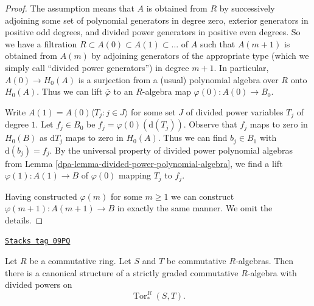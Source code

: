 \begin{proof}

The assumption means that $A$ is obtained from $R$ by successively adjoining
some set of polynomial generators in degree zero, exterior generators
in positive odd degrees, and divided power generators
in positive even degrees. So we have a filtration
$R \subset A(0) \subset A(1) \subset \ldots$
of $A$ such that $A(m + 1)$ is obtained from $A(m)$ by adjoining
generators of the appropriate type (which we simply call
``divided power generators'') in degree $m + 1$.
In particular, $A(0) \to H_0(A)$ is a surjection from a (usual) polynomial
algebra over $R$ onto $H_0(A)$. Thus we can lift $\overline{\varphi}$
to an $R$-algebra map $\varphi(0) : A(0) \to B_0$.

\medskip\noindent
Write $A(1) = A(0)\langle T_j:j\in J\rangle$ for some
set $J$ of divided power variables $T_j$ of degree $1$. Let $f_j \in B_0$
be $f_j = \varphi(0)(\text{d}(T_j))$. Observe that $f_j$
maps to zero in $H_0(B)$ as $\text{d}T_j$ maps to zero in $H_0(A)$.
Thus we can find $b_j \in B_1$ with $\text{d}(b_j) = f_j$.
By the universal property of divided power polynomial algebras from
Lemma \ref{dpa-lemma-divided-power-polynomial-algebra},
we find a lift $\varphi(1) : A(1) \to B$ of $\varphi(0)$
mapping $T_j$ to $f_j$.

\medskip\noindent
Having constructed $\varphi(m)$ for some $m \geq 1$ we can construct
$\varphi(m + 1) : A(m + 1) \to B$ in exactly the same manner.
We omit the details.
\end{proof}

\begin{lemma}
\label{dpa-lemma-divided-powers-on-tor}
\href{https://stacks.math.columbia.edu/tag/09PQ}{\texttt{Stacks tag 09PQ}}

Let $R$ be a commutative ring. Let $S$ and $T$ be commutative $R$-algebras.
Then there is a canonical structure
of a strictly graded commutative $R$-algebra with divided powers on
$$
\operatorname{Tor}_*^R(S, T).
$$
\end{lemma}

